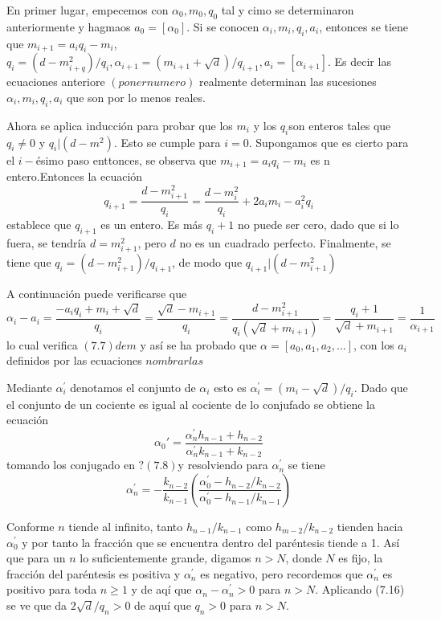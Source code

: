 \documentclass[11pt, article]{article}
\begin{document}
    En primer lugar, empecemos con $\alpha_0,m_0,q_0$ tal y cimo se determinaron anteriormente  y hagmaos $a_0=[\alpha_0]$. Si se conocen $\alpha_i,m_i,q_i,a_i$, entonces se tiene que $m_{i+1}=a_iq_i - m_i$, $q_i=(d-m_{i+q}^2)/q_i, \alpha_{i+1}=(m_{i+1} + \sqrt{d})/q_{i+1}, a_i=[\alpha_{i+1}]$. Es decir las ecuaciones anteriore $(poner numero)$ realmente determinan las sucesiones $\alpha_i,m_i,q_i,a_i$ que son por lo menos reales.
    
    Ahora se aplica inducción para probar que los $m_i$ y los $q_i$son enteros tales que $q_i\not=0$ y $q_i|(d-m^2)$. Esto se cumple para $i=0$. Supongamos que es cierto para el $i-$ésimo paso enttonces, se observa que $m_{i+1}=a_iq_i-m_i$ es n entero.Entonces la ecuación 
         \[
        q_{i+1}=\dfrac{d-m_{i+1}^2}{q_i}=\dfrac{d-m_i^2}{q_i} + 2a_im_i-a_i^2q_i
        \]
    establece que $q_{i+1}$ es un entero. Es más $q_i+1$ no puede ser cero, dado que si lo fuera, se tendría $d=m^2_{i+1}$, pero $d$ no es un cuadrado perfecto. Finalmente, se tiene que $q_i=(d-m_{i+1}^2)/q_{i+1}$, de modo que $q_{i+1}|(d-m_{i+1}^2)$
    
    A continuación puede verificarse que 
        \[
        \alpha_i-a_i=\dfrac{-a_iq_i+m_i+\sqrt{d}}{q_i}=\dfrac{\sqrt{d}-m_{i+1}}{q_i}=\dfrac{d-m_{i+1}^2}{q_i(\sqrt{d}+m_{i+1})}=\dfrac{q_i+1}{\sqrt{d}+m_{i+1}}=\dfrac{1}{\alpha_{i+1}}
        \]
    lo cual verifica $(7.7)dem$ y así se ha probado que $\alpha=[a_0,a_1,a_2,...]$, con los $a_i$ definidos por las ecuaciones $nombrarlas$ 
    
    Mediante $\alpha^{'}_{i}$ denotamos el conjunto de $\alpha_i$ esto es $\alpha^{'}_{i}=(m_i-\sqrt{d})/q_i$. Dado que el conjunto de un cociente es igual al cociente de lo conjufado se obtiene la ecuación
        \[
        \alpha_0{'}=\dfrac{\alpha_n^{'}h_{n-1}+h_{n-2}}{\alpha_n^{'}k_{n-1}+k_{n-2}}
        \]
    tomando los conjugado en $?(7.8)$y resolviendo para $\alpha_n^{'}$ se tiene
        \[
        \alpha_n^{'}=-\dfrac{k_{n-2}}{k_{n-1}}\left(\dfrac{\alpha_0^{'}-h_{n-2}/k_{n-2}}{\alpha_0^{'}-h_{n-1}/k_{n-1}}\right)
        \]
        
    Conforme $n$ tiende al infinito, tanto $h_{n-1}/k_{n-1}$ como $h_{m-2}/k_{n-2}$ tienden hacia $\alpha_0^{'}$ y por tanto la fracción que se encuentra dentro del paréntesis tiende a 1. Así que para un $n$ lo suficientemente grande, digamos $n>N$, 
    donde $N$ es fijo, la fracción del paréntesis es positiva y $\alpha_n^{'}$ es negativo, pero recordemos que $\alpha_n^{'}$ es positivo para toda
    $n\geq 1$ y de aqí que $\alpha_n - \alpha_n^{'}>0$ para $n>N$. Aplicando (7.16) se ve que da $2 \sqrt{d}/q_{n} >0$
    de aquí que $q_n>0$ para $n>N$.
    
\end{document}
